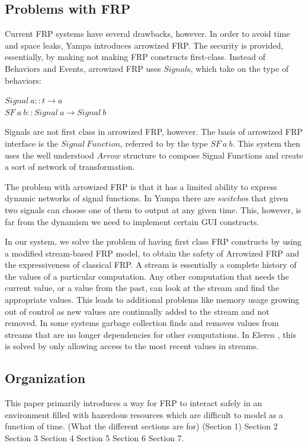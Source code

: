 \documentclass[twocolumn,11pt,english]{article}
\begin{document}
\subsection{Problems with FRP}
  Current FRP systems have several drawbacks, however. In order to avoid time and space leaks, Yampa \cite{hudak2003arrows} introduces arrowized FRP. The security is provided, essentially, by making not making FRP constructs first-class. Instead of Behaviors and Events, arrowized FRP uses $Signal$s, which take on the type of behaviors:
\begin{center}
  $Signal~a:: t \rightarrow a$
\\$SF~a~b:: Signal~a \rightarrow Signal~b$
\end{center}

Signals are not first class in arrowized FRP, however. The basis of arrowized FRP interface is the $Signal~Function$, referred to by the type $SF~a~b$. This system then uses the well understood $Arrow$ structure to compose Signal Functions and create a sort of network of transformation. 

The problem with arrowized FRP is that it has a limited ability to express dynamic networks of signal functions. In Yampa there are $switch$es that given two signals can choose one of them to output at any given time. This, however, is far from the dynamism we need to implement certain GUI constructs. 

 In our system, we solve the problem of having first class FRP constructs by using a modified stream-based FRP model\cite{HighOrderStreams}, to obtain the safety of Arrowized FRP and the expressiveness of classical FRP. A stream is essentially a complete history of the values of a particular computation. Any other computation that needs the current value, or a value from the past, can look at the stream and find the appropriate values. This leads to additional problems like memory usage growing out of control as new values are continually added to the stream and not removed. In some systems garbage collection finds and removes values from streams that are no longer dependencies for other computations. In Elerea \cite{HighOrderStreams}, this is solved by only allowing access to the most recent values in streams. 


\subsection{Organization}
This paper primarily introduces a way for FRP to interact safely in an environment filled with hazerdous resources which are difficult to model as a function of time. (What the different sections are for) (Section 1) Section 2 Section 3 Section 4 Section 5 Section 6 Section 7.
\end{document}
